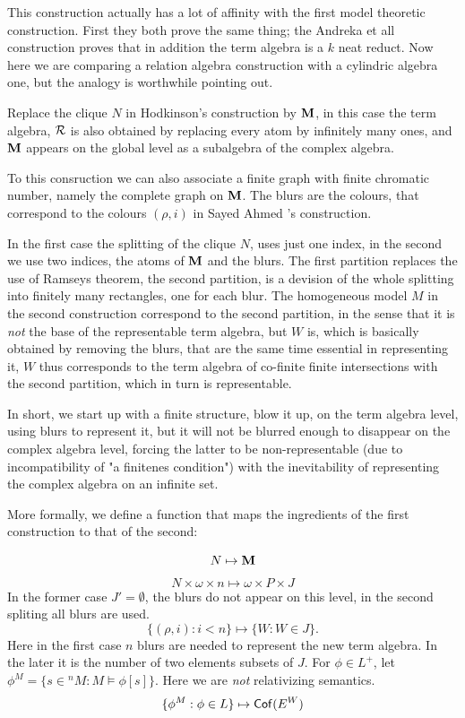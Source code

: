 \documentclass[12pt]{article}
\theoremstyle{definition}
\def\Cof{{\sf Cof}}
\begin{document}
This construction actually has a lot of affinity with the first  model theoretic construction.
First they both prove the same thing; the Andreka et all construction  proves that in addition the term algebra is a $k$ neat reduct.
Now here we are comparing a relation algebra construction with a cylindric algebra one, but the analogy is worthwhile pointing out.

Replace the clique $N$ in Hodkinson's construction by $\bold M$, in this case the term algebra, 
$\cal R$ is also obtained by replacing every atom by infinitely many ones, 
and $\bold M$ appears on the global level as a subalgebra of the complex algebra.

To this consruction we can also associate a finite graph with finite chromatic number, namely the complete graph on $\bold M$.
The blurs are the colours, that correspond to the colours $(\rho, i)$ in Sayed Ahmed 's construction.  

In the first case the splitting of the clique $N$, uses just one index, in the second we use two indices, the atoms of $\bold M$ and the blurs.
The first partition replaces the use of Ramseys theorem, the second partition, is a devision of the whole splitting into finitely many 
rectangles, one for each blur.  The homogeneous model $M$ in the second construction correspond to the second partition,  in the sense 
that it is {\it not}  the base of the representable term algebra,
but $W$ is, which is basically obtained by removing the blurs, that are the same time 
essential in representing it, $W$ thus corresponds to the term algebra of co-finite finite intersections with the second partition, 
which in turn is representable.

In short, we start up with a finite structure, blow it up, on the term algebra level, using blurs to represent it, 
but it will not be blurred enough to disappear on the complex algebra level, forcing
the latter to be non-representable (due to incompatibility of "a finitenes condition") with the inevitability 
of representing the complex algebra on an infinite set.

More formally, we define a function that maps the ingredients of the first construction to that of the second:

$$N\mapsto \bold M$$
$$N\times \omega\times n\mapsto \omega\times P\times J$$
In the former case $J'=\emptyset$, the blurs do not appear on this level, in the second spliting all blurs are used.
$$\{(\rho , i): i<n \}\mapsto \{ W: W\in J\}.$$
Here in the first case $n$ blurs are needed to represent the new term algebra. In the later it is the number of two elements subsets of 
$J$.
For $\phi\in L^+$, let $\phi^M=\{s\in {}^nM: M\models \phi[s]\}.$
Here we are {\it not} relativizing semantics.
$$\{{\phi}^M: \phi \in L\}\mapsto \Cof(E^W)$$
\end{document}
